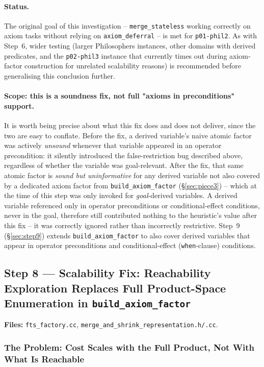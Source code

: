 \documentclass[11pt,a4paper]{article}
\begin{document}
\paragraph{Status.} The original goal of this investigation --
\texttt{merge\_stateless} working correctly on axiom tasks without relying on
\texttt{axiom\_deferral} -- is met for \texttt{p01-phil2}. As with Step~6,
wider testing (larger Philosophers instances, other domains with derived
predicates, and the \texttt{p02-phil3} instance that currently times out
during axiom-factor construction for unrelated scalability reasons) is
recommended before generalising this conclusion further.

\paragraph{Scope: this is a soundness fix, not full "axioms in preconditions"
support.} It is worth being precise about what this fix does and does not
deliver, since the two are easy to conflate. Before the fix, a derived
variable's naive atomic factor was actively \emph{unsound} whenever that
variable appeared in an operator precondition: it silently introduced the
false-restriction bug described above, regardless of whether the variable
was goal-relevant. After the fix, that same atomic factor is
\emph{sound but uninformative} for any derived variable not also covered by
a dedicated axiom factor from \texttt{build\_axiom\_factor}
(\S\ref{sec:piece3}) -- which at the time of this step was only invoked for
\emph{goal}-derived variables. A derived variable referenced only in operator
preconditions or conditional-effect conditions, never in the goal, therefore
still contributed nothing to the heuristic's value after this fix -- it was
correctly ignored rather than incorrectly restrictive. Step~9
(\S\ref{sec:step9}) extends \texttt{build\_axiom\_factor} to also cover
derived variables that appear in operator preconditions and
conditional-effect (\texttt{when}-clause) conditions.

\subsection{Step 8 --- Scalability Fix: Reachability Exploration Replaces Full
Product-Space Enumeration in \texttt{build\_axiom\_factor}}
\label{sec:step8}

\textbf{Files:} \texttt{fts\_factory.cc}, \texttt{merge\_and\_shrink\_representation.h/.cc}.

\subsubsection{The Problem: Cost Scales with the Full Product, Not With
What Is Reachable}
\end{document}
